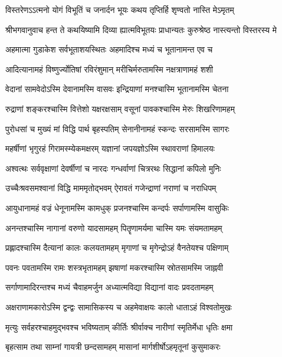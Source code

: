 \twolineshloka
{विस्तरेणऽऽत्मनो योगं विभूतिं च जनार्दन}
{भूयः कथय तृप्तिर्हि शृण्वतो नास्ति मेऽमृतम्}%

{श्रीभगवानुवाच}
\twolineshloka
{हन्त ते कथयिष्यामि दिव्या ह्यात्मविभूतयः}
{प्राधान्यतः कुरुश्रेष्ठ नास्त्यन्तो विस्तरस्य मे}%

\twolineshloka
{अहमात्मा गुडाकेश सर्वभूताशयस्थितः}
{अहमादिश्च मध्यं च भूतानामन्त एव च}%

\twolineshloka
{आदित्यानामहं विष्णुर्ज्योतिषां रविरंशुमान्}
{मरीचिर्मरुतामस्मि नक्षत्राणामहं शशी}%

\twolineshloka
{वेदानां सामवेदोऽस्मि देवानामस्मि वासवः}
{इन्द्रियाणां मनश्चास्मि भूतानामस्मि चेतना}%

\twolineshloka
{रुद्राणां शङ्करश्चास्मि वित्तेशो यक्षरक्षसाम्}
{वसूनां पावकश्चास्मि मेरुः शिखरिणामहम्}%

\twolineshloka
{पुरोधसां च मुख्यं मां विद्धि पार्थ बृहस्पतिम्}
{सेनानीनामहं स्कन्दः सरसामस्मि सागरः}%

\twolineshloka
{महर्षीणां भृगुरहं गिरामस्म्येकमक्षरम्}
{यज्ञानां जपयज्ञोऽस्मि स्थावराणां हिमालयः}%

\twolineshloka
{अश्वत्थः सर्ववृक्षाणां देवर्षीणां च नारदः}
{गन्धर्वाणां चित्ररथः सिद्धानां कपिलो मुनिः}%

\twolineshloka
{उच्चैःश्रवसमश्वानां विद्धि माममृतोद्भवम्}
{ऐरावतं गजेन्द्राणां नराणां च नराधिपम्}%

\twolineshloka
{आयुधानामहं वज्रं धेनूनामस्मि कामधुक्}
{प्रजनश्चास्मि कन्दर्पः सर्पाणामस्मि वासुकिः}%

\twolineshloka
{अनन्तश्चास्मि नागानां वरुणो यादसामहम्}
{पितॄणामर्यमा चास्मि यमः संयमतामहम्}%

\twolineshloka
{प्रह्लादश्चास्मि दैत्यानां कालः कलयतामहम्}
{मृगाणां च मृगेन्द्रोऽहं वैनतेयश्च पक्षिणाम्}%

\twolineshloka
{पवनः पवतामस्मि रामः शस्त्रभृतामहम्}
{झषाणां मकरश्चास्मि स्रोतसामस्मि जाह्नवी}%

\twolineshloka
{सर्गाणामादिरन्तश्च मध्यं चैवाहमर्जुन}
{अध्यात्मविद्या विद्यानां वादः प्रवदतामहम्}%

\twolineshloka
{अक्षराणामकारोऽस्मि द्वन्द्वः सामासिकस्य च}
{अहमेवाक्षयः कालो धाताऽहं विश्वतोमुखः}%

\twolineshloka
{मृत्युः सर्वहरश्चाहमुद्भवश्च भविष्यताम्}
{कीर्तिः श्रीर्वाक्च नारीणां स्मृतिर्मेधा धृतिः क्षमा}%

\twolineshloka
{बृहत्साम तथा साम्नां गायत्री छन्दसामहम्}
{मासानां मार्गशीर्षोऽहमृतूनां कुसुमाकरः}%

